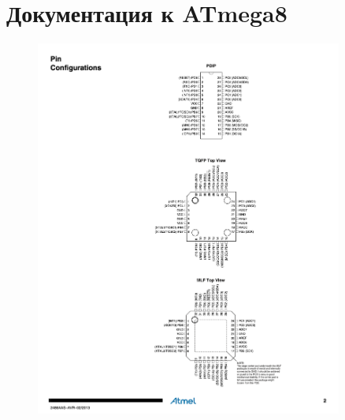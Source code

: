\documentclass[14pt]{extreport}
\begin{document}
\begin{sloppypar}
\chapter{Документация к ATmega8}
\label{appendmk}
\begin{figure}[ht]
	\centering
	\includegraphics[width=0.9\textwidth]{./images/atmega_dh1.png}
	\label{fig:atmega}
\end{figure}
\begin{figure}[ht]
	\centering

\end{figure}
\end{sloppypar}
\end{document}
